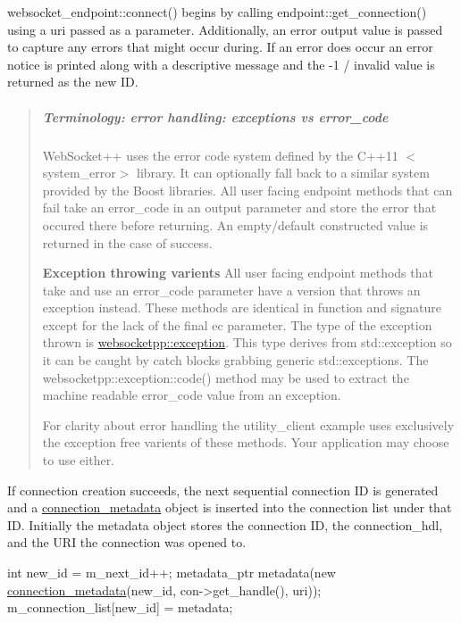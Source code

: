 {\ttfamily websocket\+\_\+endpoint\+::connect()} begins by calling {\ttfamily endpoint\+::get\+\_\+connection()} using a uri passed as a parameter. Additionally, an error output value is passed to capture any errors that might occur during. If an error does occur an error notice is printed along with a descriptive message and the -\/1 / \textquotesingle{}invalid\textquotesingle{} value is returned as the new ID.

\begin{quote}
\subparagraph*{Terminology\+: {\ttfamily error handling\+: exceptions vs error\+\_\+code}}

Web\+Socket++ uses the error code system defined by the C++11 {\ttfamily $<$system\+\_\+error$>$} library. It can optionally fall back to a similar system provided by the Boost libraries. All user facing endpoint methods that can fail take an {\ttfamily error\+\_\+code} in an output parameter and store the error that occured there before returning. An empty/default constructed value is returned in the case of success.

{\bfseries Exception throwing varients} All user facing endpoint methods that take and use an {\ttfamily error\+\_\+code} parameter have a version that throws an exception instead. These methods are identical in function and signature except for the lack of the final ec parameter. The type of the exception thrown is {\ttfamily \hyperlink{classwebsocketpp_1_1exception}{websocketpp\+::exception}}. This type derives from {\ttfamily std\+::exception} so it can be caught by catch blocks grabbing generic {\ttfamily std\+::exception}s. The {\ttfamily websocketpp\+::exception\+::code()} method may be used to extract the machine readable {\ttfamily error\+\_\+code} value from an exception.

For clarity about error handling the utility\+\_\+client example uses exclusively the exception free varients of these methods. Your application may choose to use either. \end{quote}


If connection creation succeeds, the next sequential connection ID is generated and a {\ttfamily \hyperlink{classconnection__metadata}{connection\+\_\+metadata}} object is inserted into the connection list under that ID. Initially the metadata object stores the connection ID, the {\ttfamily connection\+\_\+hdl}, and the U\+RI the connection was opened to.


\begin{DoxyCode}
\textcolor{keywordtype}{int} new\_id = m\_next\_id++;
metadata\_ptr metadata(\textcolor{keyword}{new} \hyperlink{classconnection__metadata}{connection\_metadata}(new\_id, con->get\_handle(), uri));
m\_connection\_list[new\_id] = metadata;
\end{DoxyCode}


